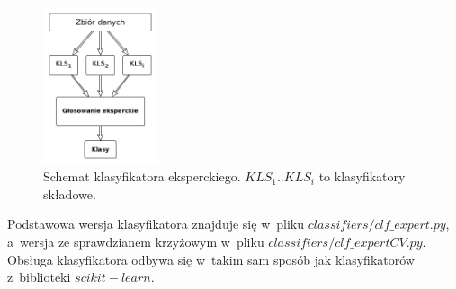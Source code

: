 \begin{figure}[H]
	\centering
	\includegraphics[width=0.3\textwidth]{./images/klas_ekspercki.png}
	\caption[Schemat klasyfikatora eksperckiego]{Schemat klasyfikatora eksperckiego. $KLS_1..KLS_i$ to klasyfikatory składowe.}
	\label{fig:klasyfikator_ekspercki}
\end{figure}
Podstawowa wersja klasyfikatora znajduje się w~pliku $classifiers/clf\_expert.py$, a~wersja ze sprawdzianem krzyżowym w~pliku $classifiers/clf\_expertCV.py$. Obsługa klasyfikatora odbywa się w~takim sam sposób jak klasyfikatorów z~biblioteki $scikit-learn$.
